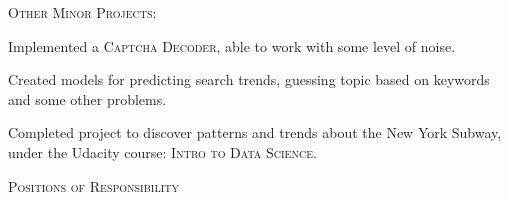 \documentclass[10pt]{article}
\begin{document}
	\vspace{1mm}
	
	\large{\textsc{Other Minor Projects:}}
	\begin{itemize}
	\small
	{
	\item Implemented a \textsc{Captcha Decoder}, able to work with some level of noise.
	\item Created models for predicting search trends, guessing topic based on keywords and some other problems.
	\item Completed project to discover patterns and trends about the New York Subway, under the Udacity course: \textsc{Intro to Data Science}.
	}
	\end{itemize}
 	
	\vspace{4mm}
	
	{\centering\Large{\textsc{Positions of Responsibility}}	\hrulefill}
		
	\vspace{4mm}		
\end{document}
